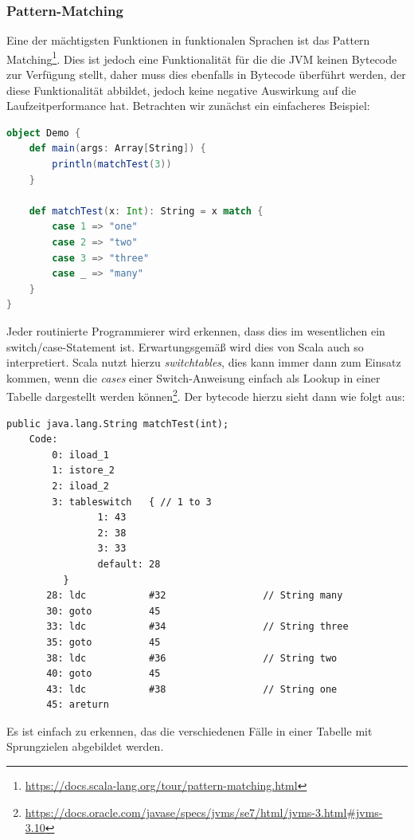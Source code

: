 \documentclass[a4paper, 11pt]{article}
\begin{document}
	
	
	
	  
	  
	  \subsubsection{Pattern-Matching}
	  Eine der mächtigsten Funktionen in funktionalen Sprachen ist das Pattern Matching\footnote{\url{https://docs.scala-lang.org/tour/pattern-matching.html}}. Dies ist jedoch eine Funktionalität für die die JVM keinen Bytecode zur Verfügung stellt, daher muss dies ebenfalls in Bytecode überführt werden, der diese Funktionalität abbildet, jedoch keine negative Auswirkung auf die Laufzeitperformance hat. Betrachten wir zunächst ein einfacheres Beispiel:
	  \begin{lstlisting}[language=Scala]
object Demo {
	def main(args: Array[String]) {
		println(matchTest(3))
	}
	
	def matchTest(x: Int): String = x match {
		case 1 => "one"
		case 2 => "two"
		case 3 => "three"
		case _ => "many"
	}
}
	  \end{lstlisting}
	  Jeder routinierte Programmierer wird erkennen, dass dies im wesentlichen ein switch/case-Statement ist. Erwartungsgemäß wird dies von Scala auch so interpretiert. Scala nutzt hierzu \textit{switchtables}, dies kann immer dann zum Einsatz kommen, wenn die \textit{cases} einer Switch-Anweisung einfach als Lookup in einer Tabelle dargestellt werden können\footnote{\url{https://docs.oracle.com/javase/specs/jvms/se7/html/jvms-3.html\#jvms-3.10}}. Der bytecode hierzu sieht dann wie folgt aus:
		\begin{lstlisting}[language=JVMIS]
public java.lang.String matchTest(int);
	Code:
	    0: iload_1
	    1: istore_2
	    2: iload_2
	    3: tableswitch   { // 1 to 3
				1: 43
				2: 38
				3: 33
				default: 28
		  }
	   28: ldc           #32                 // String many
	   30: goto          45
	   33: ldc           #34                 // String three
	   35: goto          45
	   38: ldc           #36                 // String two
	   40: goto          45
	   43: ldc           #38                 // String one
	   45: areturn
		\end{lstlisting}
	  Es ist einfach zu erkennen, das die verschiedenen Fälle in einer Tabelle mit Sprungzielen abgebildet werden.
	  
\end{document}
